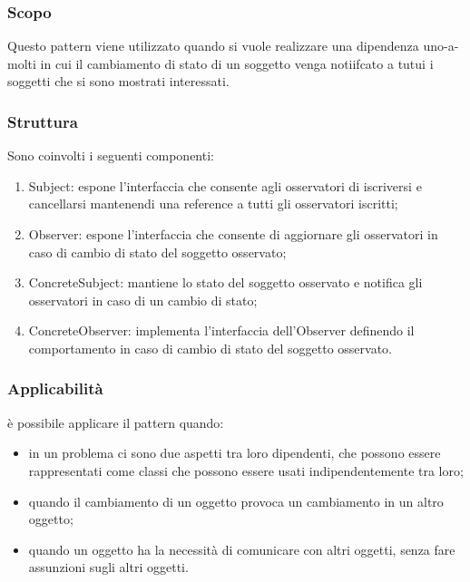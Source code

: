 \subsubsection{Scopo} Questo pattern viene utilizzato quando si vuole realizzare una dipendenza uno-a-molti in cui il cambiamento di stato di un soggetto venga notiifcato a tutui i soggetti che si sono mostrati interessati.

\subsubsection{Struttura} Sono coinvolti i seguenti componenti:

\begin{enumerate}
	\item Subject: espone l’interfaccia che consente agli osservatori di iscriversi e cancellarsi mantenendi una reference a tutti gli osservatori iscritti;
	\item Observer: espone l’interfaccia che consente di aggiornare gli osservatori in caso di cambio di stato del soggetto osservato;
	\item ConcreteSubject: mantiene lo stato del soggetto osservato e notifica gli osservatori in caso di un cambio di stato;
	\item ConcreteObserver: implementa l’interfaccia dell’Observer definendo il comportamento in caso di cambio di stato del soggetto osservato.
\end{enumerate}

\subsubsection{Applicabilità} è possibile applicare il pattern quando:

\begin{itemize}
	\item in un problema ci sono due aspetti tra loro dipendenti, che possono essere rappresentati come classi che possono essere usati indipendentemente tra loro;
	\item quando il cambiamento di un oggetto provoca un cambiamento in un altro oggetto;
	\item quando un oggetto ha la necessità di comunicare con altri oggetti, senza fare assunzioni sugli altri oggetti.
\end{itemize}
